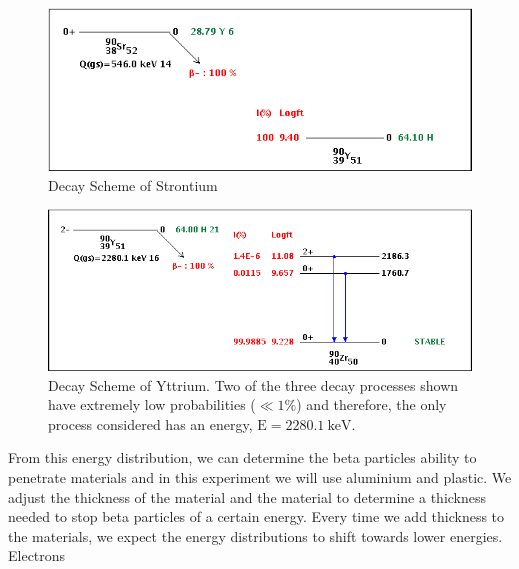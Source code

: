 \begin{figure}
	[tbp] \centering 
	\includegraphics[width=.9
	\textwidth]{Figures/90SrDecay.png} \caption{Decay Scheme of Strontium} \label{fig:Figures_90SrDecay} 
\end{figure}%
\begin{figure}
	[tbp] \centering 
	\includegraphics[width=.9
	\textwidth]{Figures/90YDecay.png} \caption{Decay Scheme of Yttrium.  Two of the three decay processes shown have extremely low probabilities ($\ll 1\%$) and therefore, the only process considered has an energy, $\text{E}=2280.1~\text{keV}$.} \label{fig:Figures_90YDecay} 
\end{figure}%


From this energy distribution, we can determine the beta particles ability to penetrate materials and in this experiment we will use aluminium and plastic. We adjust the thickness of the material and the material to determine a thickness needed to stop beta particles of a certain energy. Every time we add thickness to the materials, we expect the energy distributions to shift towards lower energies.  Electrons 


